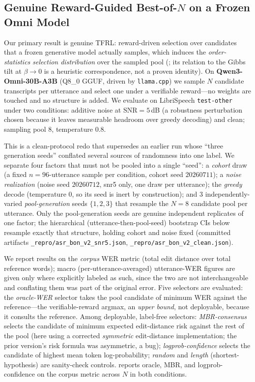 \subsection{Genuine Reward-Guided Best-of-$N$ on a Frozen Omni Model}
\label{sec:res:bon}\label{sec:c1}

Our primary result is genuine TFRL: reward-driven selection over candidates that a frozen generative model actually samples, which induces the \emph{order-statistics selection distribution} over the sampled pool (; its relation to the Gibbs tilt at $\beta\!\to\!0$ is a heuristic correspondence, not a proven identity). On \textbf{Qwen3-Omni-30B-A3B} (Q8\_0 GGUF, driven by \texttt{llama.cpp}) we sample $N$ candidate transcripts per utterance and select one under a verifiable reward---no weights are touched and no structure is added. We evaluate on LibriSpeech \texttt{test-other} under two conditions: additive noise at $\mathrm{SNR}{=}5$\,dB (a robustness perturbation chosen because it leaves measurable headroom over greedy decoding) and clean; sampling pool $8$, temperature $0.8$.

This is a clean-protocol redo that supersedes an earlier run whose ``three generation seeds'' conflated several sources of randomness into one label. We separate four factors that must not be pooled into a single ``seed'': a \emph{cohort} draw (a fixed $n{=}96$-utterance sample per condition, cohort seed $20260711$); a \emph{noise realization} (noise seed $20260712$, snr5 only, one draw per utterance); the \emph{greedy} decode (temperature $0$, so its seed is inert by construction); and $3$ independently-varied \emph{pool-generation} seeds $\{1,2,3\}$ that resample the $N{=}8$ candidate pool per utterance. Only the pool-generation seeds are genuine independent replicates of one factor; the hierarchical (utterance-then-pool-seed) bootstrap CIs below resample exactly that structure, holding cohort and noise fixed (committed artifacts \texttt{\_repro/asr\_bon\_v2\_snr5.json}, \texttt{\_repro/asr\_bon\_v2\_clean.json}).

We report results on the \emph{corpus} WER metric (total edit distance over total reference words); macro (per-utterance-averaged) utterance-WER figures are given only where explicitly labeled as such, since the two are not interchangeable and conflating them was part of the original error. Five selectors are evaluated: the \emph{oracle-WER} selector takes the pool candidate of minimum WER against the reference---the verifiable-reward argmax, an \emph{upper bound}, not deployable, because it consults the reference. Among deployable, label-free selectors: \emph{MBR-consensus} selects the candidate of minimum expected edit-distance risk against the rest of the pool (here using a corrected \emph{symmetric} edit-distance implementation; the prior version's risk formula was asymmetric, a bug); \emph{logprob-confidence} selects the candidate of highest mean token log-probability; \emph{random} and \emph{length} (shortest-hypothesis) are sanity-check controls.  reports oracle, MBR, and logprob-confidence on the corpus metric across $N$ in both conditions.

